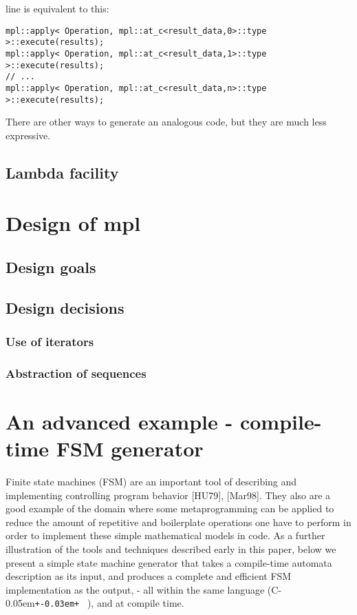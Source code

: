 \documentclass{kapproc}
\newcommand{\Cpp}{C\kern-0.05em\texttt{+\kern-0.03em+}%
}
\newcommand{\mping}{meta\-pro\-gram\-ming}
\begin{document}
line is equivalent to this:

{\small
\begin{codesamp}\begin{verbatim}
mpl::apply< Operation, mpl::at_c<result_data,0>::type >::execute(results);
mpl::apply< Operation, mpl::at_c<result_data,1>::type >::execute(results);
// ...
mpl::apply< Operation, mpl::at_c<result_data,n>::type >::execute(results);
\end{verbatim}
\end{codesamp}
}

There are other ways to generate an analogous code, 
but they are much less expressive.


\subsection{Lambda facility}

\section{Design of mpl}
\subsection{Design goals}
\subsection{Design decisions}
\subsubsection{Use of iterators}
\subsubsection{Abstraction of sequences}

\section{An advanced example - compile-time FSM generator}

Finite state machines (FSM) are an important tool of 
describing and implementing controlling program behavior 
[HU79], [Mar98]. They also are a good example of the domain 
where some \mping{} can be applied to reduce the amount of 
repetitive and boilerplate operations one have to perform 
in order to implement these simple mathematical models in 
code. As a further illustration of the tools and techniques 
described early in this paper, below we present a simple 
state machine generator that takes a compile-time automata 
description as its input, and produces a complete and 
efficient FSM implementation as the output, - all within 
the same language (\Cpp\ ), and at compile time.
\end{document}
